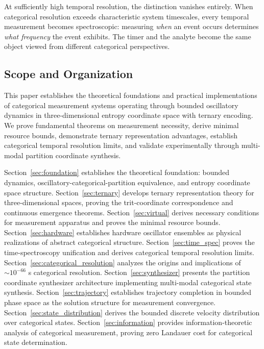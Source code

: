 \documentclass[11pt,a4paper]{article}
\theoremstyle{remark}
\begin{document}
At sufficiently high temporal resolution, the distinction vanishes entirely. When categorical resolution exceeds characteristic system timescales, every temporal measurement becomes spectroscopic: measuring \textit{when} an event occurs determines \textit{what frequency} the event exhibits. The timer and the analyte become the same object viewed from different categorical perspectives.

\subsection{Scope and Organization}

This paper establishes the theoretical foundations and practical implementations of categorical measurement systems operating through bounded oscillatory dynamics in three-dimensional entropy coordinate space with ternary encoding. We prove fundamental theorems on measurement necessity, derive minimal resource bounds, demonstrate ternary representation advantages, establish categorical temporal resolution limits, and validate experimentally through multi-modal partition coordinate synthesis.

Section~\ref{sec:foundation} establishes the theoretical foundation: bounded dynamics, oscillatory-categorical-partition equivalence, and entropy coordinate space structure. Section~\ref{sec:ternary} develops ternary representation theory for three-dimensional spaces, proving the trit-coordinate correspondence and continuous emergence theorems. Section~\ref{sec:virtual} derives necessary conditions for measurement apparatus and proves the minimal resource bounds. Section~\ref{sec:hardware} establishes hardware oscillator ensembles as physical realizations of abstract categorical structure. Section~\ref{sec:time_spec} proves the time-spectroscopy unification and derives categorical temporal resolution limits. Section~\ref{sec:categorical_resolution} analyzes the origins and implications of $\sim 10^{-66}$ s categorical resolution. Section~\ref{sec:synthesizer} presents the partition coordinate synthesizer architecture implementing multi-modal categorical state synthesis. Section~\ref{sec:trajectory} establishes trajectory completion in bounded phase space as the solution structure for measurement convergence. Section~\ref{sec:state_distribution} derives the bounded discrete velocity distribution over categorical states. Section~\ref{sec:information} provides information-theoretic analysis of categorical measurement, proving zero Landauer cost for categorical state determination.
\end{document}
